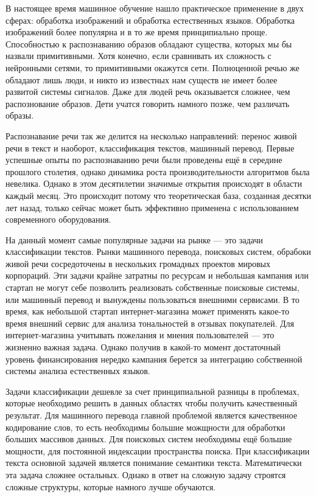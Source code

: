 \label{sec:intro}

В настоящее время машинное обучение нашло практическое применение в двух сферах: обработка изображений и обработка естественных языков. Обработка изображений более популярна и в то же время принципиально проще. Способностью к распознаванию образов обладают существа, которых мы бы назвали примитивными. Хотя конечно, если сравнивать их сложность с нейронными сетями, то примитивными окажутся сети. Полноценной речью же обладают лишь люди, и никто из известных нам существ не имеет более развитой системы сигналов. Даже для людей речь оказывается сложнее, чем распознование образов. Дети учатся говорить намного позже, чем различать образы.

Распознавание речи так же делится на несколько направлений: перенос живой речи в текст и наоборот, классификация текстов, машинный перевод. Первые успешные опыты по распознаванию речи были проведены ещё в середине прошлого столетия, однако динамика роста производительности алгоритмов была невелика. Однако в этом десятилетии значимые открытия происходят в области каждый месяц. Это происходит потому что теоретическая база, созданная десятки лет назад, только сейчас может быть эффективно применена с использованием современного оборудования.

На данный момент самые популярные задачи на рынке --- это задачи классификации текстов. Рынки машинного перевода, поисковых систем, обрабоки живой речи сосредоточены в нескольких громадных проектов мировых корпораций. Эти задачи крайне затратны по ресурсам и небольшая кампания или стартап не могут себе позволить реализовать собственные поисковые системы, или машинный перевод и вынуждены пользоваться внешними сервисами. В то время, как небольшой стартап интернет-магазина может применять какое-то время внешний сервис для анализа тональностей в отзывах покупателей. Для интернет-магазина учитывать пожелания и мнения пользователей --- это жизненно важная задача. Однако получив в какой-то момент достаточный уровень финансирования нередко кампания берется за интеграцию собственной системы анализа естественных языков.

Задачи классификации дешевле за счет принципиальной разницы в проблемах, которые необходимо решить в данных областях чтобы получить качественный результат. Для машинного перевода главной проблемой является качественное кодирование слов, то есть необходимы большие можщности для обработки больших массивов данных. Для поисковых систем необходимы ещё большие мощности, для постоянной индексации пространства поиска. При классификации текста основной задачей является понимание семантики текста. Математически эта задача сложнее остальных. Однако в ответ на сложную задачу строятся сложные структуры, которые намного лучше обучаются.


